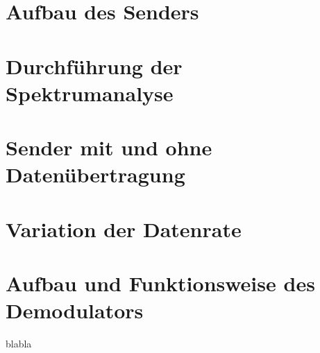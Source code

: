 
\section{Aufbau des Senders}
\section{Durchführung der Spektrumanalyse}
\section{Sender mit und ohne Datenübertragung}
\section{Variation der Datenrate}
\section{Aufbau und Funktionsweise des Demodulators}
blabla
\clearpage